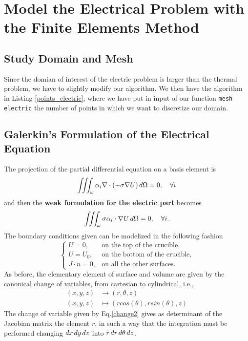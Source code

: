 


 




\section{Model the Electrical Problem with the Finite Elements Method}
\subsection{Study Domain and Mesh}
Since the domian of interest of the electric problem is larger than the thermal problem, we have to slightly modify our algorithm. We then have the algorithm in Listing \ref{points_electric}, where we have put in input of our function \texttt{mesh electric} the number of points in which we want to discretize our domain.
   




\subsection{Galerkin’s Formulation of the Electrical Equation}
The projection of the partial differential equation on a basis element is
\[\iiint_{\omega} \alpha_i \nabla\cdot(-\sigma\nabla U)\mathop{}\!d\Omega=0, \quad \forall i \]
and then the \textbf{weak formulation for the electric part} becomes
\begin{equation}
\iiint_{\omega}\sigma\alpha_i\cdot\nabla U\mathop{}\!d \Omega=0,\quad \forall i.
\end{equation}
The boundary conditions given can be modelized in the following fashion
\[\begin{cases}
	U = 0, &\text{on the top of the crucible,}\\
	U = U_0, &\text{on the bottom of the crucible,}\\
	J\cdot n=0, &\text{on all the other surfaces.}
\end{cases} \]
As before, the elementary element of surface and volume are given by the canonical change of variables, from cartesian to cylindrical, i.e., \begin{align}\label{change2}
(x,y,z)&\to(r,\theta,z)\\
(x,y,z)&\mapsto(rcos(\theta),rsin(\theta),z)\nonumber
\end{align}
The change of variable given by Eq.\ref{change2} gives as determinant of the Jacobian matrix the element $ r $, in such a way that the integration must be performed changing $ \mathop{}\!d x\mathop{}\!d y\mathop{}\!d z $ into $ r\mathop{}\!d r\mathop{}\!d\theta\mathop{}\!d z $.

